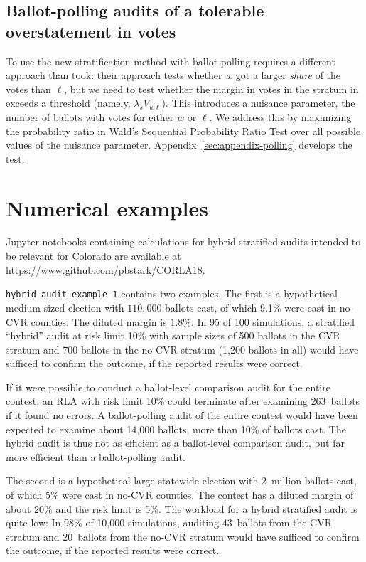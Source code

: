 \documentclass[runningheads]{llncs}
\begin{document}
\subsection{Ballot-polling audits of a tolerable overstatement in votes}
\label{sec:ballotPollError}

To use the new stratification method with ballot-polling requires a different approach than \cite{lindemanEtal12} took: their approach tests whether $w$ got a larger \emph{share} of the votes than $\ell$, but we need to test whether the margin in votes in the stratum in exceeds a threshold (namely, $\lambda_s V_{w\ell}$).
This introduces a nuisance parameter, the number of ballots with votes for either $w$ or $\ell$.
We address this by maximizing the probability ratio in Wald's Sequential Probability Ratio Test 
\cite{wald45} over all possible values of the nuisance parameter.
Appendix~\ref{sec:appendix-polling} develops the test.

\section{Numerical examples}\label{sec:examples}

Jupyter notebooks containing calculations for hybrid stratified audits intended to be relevant for Colorado are available at \url{https://www.github.com/pbstark/CORLA18}.

\texttt{hybrid-audit-example-1} contains two examples. 
The first is a hypothetical medium-sized election with 
$110,000$ ballots cast, of which 
9.1\% were cast in no-CVR counties. 
The diluted margin is $1.8\%$.
In 95 of 100 simulations, a stratified ``hybrid'' audit at risk limit 10\% with sample sizes of 500 ballots 
in the CVR stratum and 700 ballots in the no-CVR stratum
(1,200 ballots in all)
would have sufficed to confirm the outcome, if the reported results were correct.

If it were possible to conduct a ballot-level comparison audit for the entire contest, 
an RLA with risk limit 10\% could terminate after examining 263~ballots if it found no errors.
A ballot-polling audit of the entire contest would have been expected to examine about 14,000 ballots, more than 10\% of ballots cast.
The hybrid audit is thus not as efficient as a ballot-level comparison audit, but far more efficient than a ballot-polling audit.

The second is a hypothetical large statewide election with 
2~million ballots cast, of which 5\% were cast in no-CVR counties.
The contest has a diluted margin of about $20\%$ and the risk limit is 5\%.
The workload for a hybrid stratified audit is quite low:
In 98\% of 10,000 simulations, auditing 43~ballots from the 
CVR stratum and 20~ballots from the no-CVR stratum
would have sufficed to confirm the outcome, if the reported results were correct.
\end{document}
